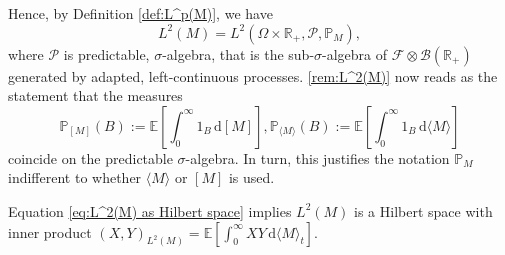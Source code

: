 \documentclass[11pt,a4paper,twoside,openany]{report}
\numberwithin{equation}{section}
\newcommand{\diff}{\mathrm{d}}
\theoremstyle{plain} %
\theoremstyle{definition} %
\theoremstyle{remark} %
\begin{document}
Hence, by Definition \ref{def:L^p(M)}, we have
\begin{equation}\label{eq:L^2(M) as Hilbert space}
    L^2(M) = L^2(\Omega\times \mathbb{R}_+,\mathcal{P},\mathbb{P}_M),
\end{equation}
where \(\mathcal{P}\) is predictable, \(\sigma\)-algebra, that is the sub-\(\sigma\)-algebra of \(\mathcal{F}\otimes\mathcal{B}(\mathbb{R}_+)\) generated by adapted, left-continuous processes. \cref{rem:L^2(M)} now reads as the statement that 
the measures
\begin{equation*}
    \mathbb{P}_{[M]}(B):=\mathbb{E}[\int_0^{\infty} 1_B\,\diff [M]],
\mathbb{P}_{\langle M\rangle}(B):=\mathbb{E}[\int_0^{\infty} 1_B\,\diff \langle M\rangle]
\end{equation*}
coincide on the predictable \(\sigma\)-algebra. In turn, this justifies the notation \(\mathbb{P}_M\) indifferent to whether \(\langle M\rangle\) or \([M]\) is used.


Equation \eqref{eq:L^2(M) as Hilbert space}  implies \(L^2(M)\) is a Hilbert space with inner product \((X,Y)_{L^2(M)}=\mathbb{E}[\int_0^{\infty}X Y\,\diff\langle M\rangle_t]\).
 
\end{document}
